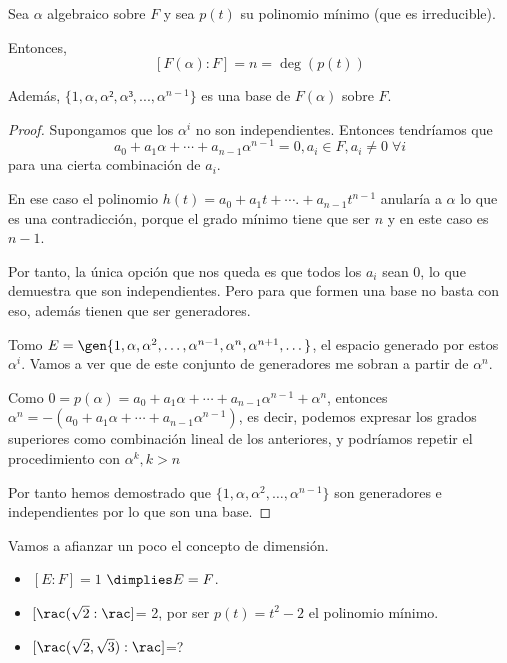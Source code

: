 \documentclass{apuntes}
\begin{document}
\begin{prop}
Sea $\alpha$ algebraico sobre $F$ y sea $p(t)$ su polinomio mínimo (que es irreducible).

Entonces, \[[F(\alpha) : F] = n = \deg(p(t))\]

Además, $\{1,\alpha,\alpha²,\alpha³,...,\alpha^{n-1}\}$ es una base de $F(\alpha)$ sobre $F$.
\end{prop}

\begin{proof}
Supongamos que los $α^i$ no son independientes. Entonces tendríamos que
\[a_0 + a_1\alpha + \dotsb + a_{n-1}\alpha^{n-1} = 0, a_i\in F, a_i \neq 0\;  \forall i\] para una cierta combinación de $a_i$.

En ese caso el polinomio $h(t) = a_0 + a_1t + \dotsb. + a_{n-1}t^{n-1}$ anularía a $\alpha$ lo que es una contradicción, porque el grado mínimo tiene que ser $n$ y en este caso es $n-1$.

Por tanto, la única opción que nos queda es que todos los $a_i$ sean 0, lo que demuestra que son independientes. Pero para que formen una base no basta con eso, además tienen que ser generadores.

Tomo $E=\gen{1,\alpha,\alpha^2,\dotsc,\alpha^{n-1},\alpha^{n},\alpha^{n+1},\dotsc}$, el espacio generado por estos $α^i$. Vamos a ver que de este conjunto de generadores me sobran a partir de $\alpha^n$.

Como $0 = p(\alpha) = a_0 + a_1\alpha + \dotsb + a_{n-1}\alpha^{n-1} + \alpha^n$, entonces $\alpha^n = -(a_0 + a_1\alpha + \dotsb + a_{n-1}\alpha^{n-1})$, es decir, podemos expresar los grados superiores como combinación lineal de los anteriores, y podríamos repetir el procedimiento con $α^k, k>n$

Por tanto hemos demostrado que  $\{1,\alpha,\alpha^2,\dotsc,\alpha^{n-1}\}$ son generadores e independientes por lo que son una base.
\end{proof}

Vamos a afianzar un poco el concepto de dimensión.
\begin{example}
\begin{itemize}
\item $[E:F] = 1$ $\dimplies E=F$.
\item $[\rac(\sqrt{2} : \rac]$= 2, por ser $p(t) = t^2 -2$ el polinomio mínimo.
\item $[\rac (\sqrt{2},\sqrt{3}) %
:\rac]$=?
\end{itemize}
\end{example}
\end{document}
